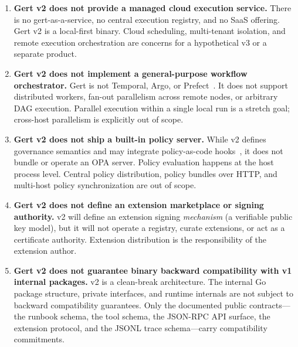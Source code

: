 \begin{enumerate}[label=\textbf{NG\arabic*.}]

  \item \textbf{Gert v2 does not provide a managed cloud execution service.}
    There is no gert-as-a-service, no central execution registry, and no SaaS offering. Gert v2 is a
    local-first binary. Cloud scheduling, multi-tenant isolation, and remote execution orchestration
    are concerns for a hypothetical v3 or a separate product.

  \item \textbf{Gert v2 does not implement a general-purpose workflow orchestrator.}
    Gert is not Temporal, Argo, or Prefect~\cite{temporal-docs,argo-workflows,prefect-docs}. It does not support distributed workers, fan-out
    parallelism across remote nodes, or arbitrary DAG execution. Parallel execution within a single
    local run is a stretch goal; cross-host parallelism is explicitly out of scope.

  \item \textbf{Gert v2 does not ship a built-in policy server.}
    While v2 defines governance semantics and may integrate policy-as-code hooks~\cite{opa-docs}, it does not
    bundle or operate an OPA server. Policy evaluation happens at the host process level. Central
    policy distribution, policy bundles over HTTP, and multi-host policy synchronization are out of
    scope.

  \item \textbf{Gert v2 does not define an extension marketplace or signing authority.}
    v2 will define an extension signing \textit{mechanism} (a verifiable public key model), but it
    will not operate a registry, curate extensions, or act as a certificate authority. Extension
    distribution is the responsibility of the extension author.

  \item \textbf{Gert v2 does not guarantee binary backward compatibility with v1 internal packages.}
    v2 is a clean-break architecture. The internal Go package structure, private interfaces, and
    runtime internals are not subject to backward compatibility guarantees. Only the documented public
    contracts---the runbook schema, the tool schema, the JSON-RPC API surface, the extension
    protocol, and the JSONL trace schema---carry compatibility commitments.

\end{enumerate}
